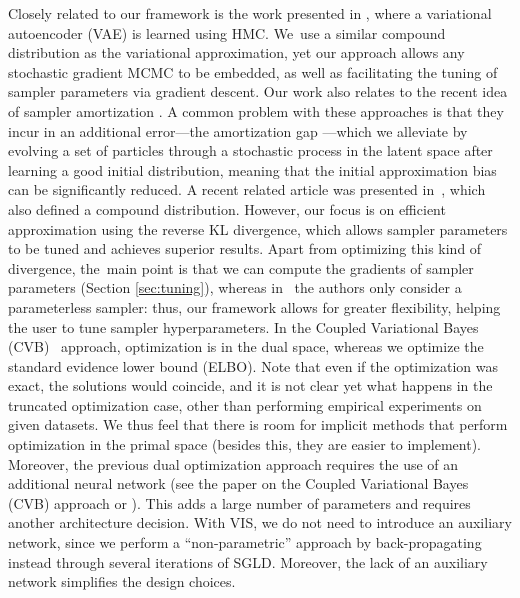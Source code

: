 {Closely related to our framework is the work presented in \cite{hoffman2017learning}, where a variational autoencoder (VAE) is learned using HMC. We~use a similar compound distribution as the variational approximation, yet 
our approach allows  any stochastic gradient MCMC to be embedded, %
 as well as facilitating the tuning of sampler parameters via gradient descent.
Our work also relates to the recent idea of 
sampler amortization \cite{feng2017learning}. 
A common problem with these approaches is that they incur in an additional error---the amortization gap \cite{cremer2018inference}---which we alleviate by evolving a set of particles through a stochastic process in the latent space after learning a good initial distribution,
meaning that %
the initial approximation bias can be significantly reduced.
A recent related article was presented in~\cite{pmlr-v97-ruiz19a},
which also defined a compound distribution. 
However, our focus is on efficient approximation using the reverse KL %
divergence, %
which allows sampler parameters to be tuned and achieves superior results. Apart from optimizing this kind of divergence, %
the~main point is that we can compute the gradients of sampler parameters %
(Section \ref{sec:tuning}), whereas in~\cite{pmlr-v97-ruiz19a} the authors only consider a parameterless sampler: %
thus, our framework allows for greater flexibility, helping the user
to tune sampler hyperparameters.
In the Coupled Variational Bayes (CVB)~\cite{dai2018coupled} approach,
optimization is in the dual space, whereas
we optimize the standard
evidence lower bound (ELBO). Note that even if the optimization was exact, the solutions would coincide, and it is not clear yet what happens in the truncated optimization case,%
other than performing empirical experiments on given datasets. We thus feel that there is room for implicit methods that perform optimization in the primal space 
(besides this, they are easier to implement). Moreover,
the previous dual optimization approach requires the use of an additional neural network (see the paper on the Coupled Variational Bayes (CVB) approach
 or \cite{fang2019implicit}). This adds a large number of parameters and requires another architecture decision. With VIS, we do not need to introduce an auxiliary network, since we perform a ``non-parametric'' approach by back-propagating instead through 
several iterations of SGLD. %
Moreover, the lack of an auxiliary network simplifies the design choices.
}


